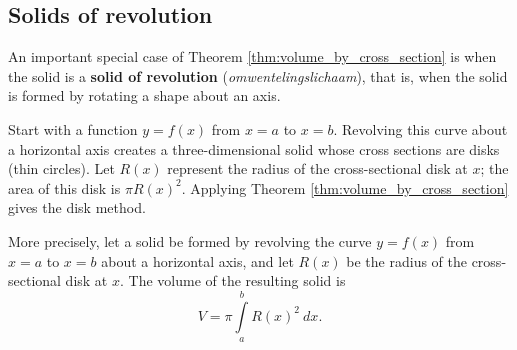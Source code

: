 \subsection{Solids of revolution}
\ifcalculus
\checkoddpage
{}
\fi
\ifanalysis
\checkoddpage
{}
\fi
An important special case of Theorem \ref{thm:volume_by_cross_section} is when the solid is a \textbf{solid of revolution} (\textit{omwente\-lingslichaam}), that is, when the solid is formed by rotating a shape about an axis. 

Start with a function $y=f(x)$ from $x=a$ to $x=b$. Revolving this curve about a horizontal axis creates a three-dimensional solid whose cross sections are disks (thin circles). Let $R(x)$ represent the radius of the cross-sectional disk at $x$; the area of this disk is $\pi R(x)^2$. Applying Theorem \ref{thm:volume_by_cross_section} gives the disk method.



More precisely, let a solid be formed by revolving the curve $y=f(x)$ from $x=a$ to $x=b$ about a horizontal axis, and let $R(x)$ be the radius of the cross-sectional disk at $x$. The volume of the resulting solid is
\begin{equation}
V = \pi \int\limits_a^b R(x)^2\ dx.
\label{idea:disk_method}
\end{equation}

